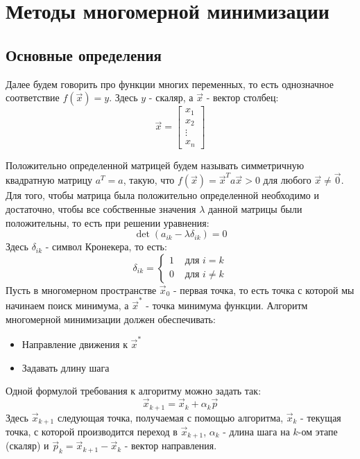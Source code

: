 \chapter{Методы многомерной минимизации}
\section{Основные определения}
Далее будем говорить про функции многих переменных, то есть однозначное соответствие $f(\vec x) = y$. Здесь $y$ - скаляр, а $\vec x$ - вектор столбец:
\begin{equation}
    \vec x = \left[
    \begin{array}{c}
         x_1  \\
         x_2  \\
         \vdots \\
         x_n
    \end{array}
    \right]
\end{equation}

Положительно определенной матрицей будем называть симметричную квадратную матрицу $a^T=a$, такую, что $f(\vec x) = {\vec x}^Ta{\vec x} > 0$ для любого $\vec x \neq \vec 0$. Для того, чтобы матрица была положительно определенной необходимо и достаточно, чтобы все собственные значения $\lambda$ данной матрицы были положительны, то есть при решении уравнения:
\begin{equation}
    \det \left( a_{ik} - \lambda\delta_{ik} \right)=0
\end{equation}
Здесь $\delta_{ik}$ - символ Кронекера, то есть:
\begin{equation*}
\delta_{ik} =
\left\{
\begin{array}{lr}
1 & \text{ для } i = k\\
0 & \text{ для } i \neq k
\end{array}
\right.
\end{equation*}
Пусть в многомерном пространстве $\vec x_0$ - первая точка, то есть точка с которой мы начинаем поиск минимума, а $\vec x^*$ - точка минимума функции. Алгоритм многомерной минимизации должен обеспечивать:
\begin{itemize}
    \item Направление движения к $\vec x^*$
    \item Задавать длину шага
\end{itemize}
Одной формулой требования к алгоритму можно задать так:
\begin{equation}
    \vec x_{k+1} =\vec x_k + \alpha_k \vec p
    \label{xk}
\end{equation}
Здесь $ \vec x_{k+1}$ следующая точка, получаемая с помощью алгоритма, $ \vec x_{k}$ - текущая точка, с которой производится переход в $ \vec x_{k+1}$, $\alpha_k$ - длина шага на $k$-ом этапе (скаляр) и $\vec p_k = \vec x_{k+1} - \vec x_{k} $ - вектор направления.

